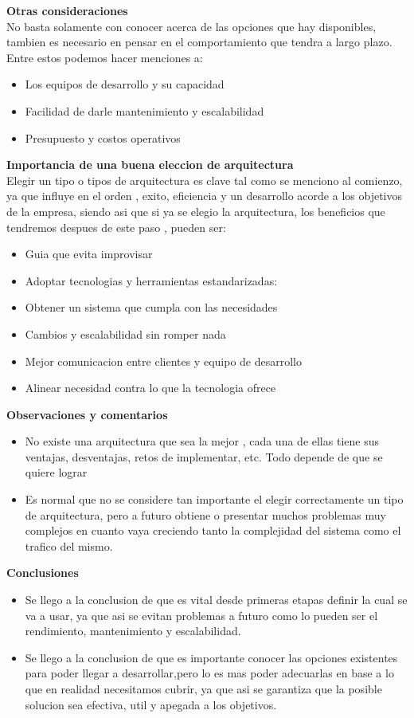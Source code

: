 \documentclass[12pt]{article}
\begin{document}
\textbf{Otras consideraciones}\\ 
No basta solamente con conocer acerca de las opciones que hay disponibles, tambien es necesario en pensar en el comportamiento que tendra a largo plazo. Entre estos podemos hacer menciones a:
\begin{itemize}
    \item{Los equipos de desarrollo y su capacidad}
    \item{Facilidad de darle mantenimiento y escalabilidad}
    \item{Presupuesto y costos operativos}
\end{itemize}

\textbf{Importancia de una buena eleccion de arquitectura} \\
Elegir un tipo o tipos de arquitectura es clave tal como se menciono al comienzo, ya que influye en el orden , exito, eficiencia y un desarrollo acorde a los objetivos de la empresa, siendo asi que si ya se elegio la arquitectura, los beneficios que tendremos despues de este paso , pueden ser:
\begin{itemize}
    \item{Guia que evita improvisar} 
    \item{Adoptar tecnologias y herramientas estandarizadas: }
     \item{Obtener un sistema que cumpla con las necesidades } 
     \item{Cambios y escalabilidad sin romper nada} 
     \item{Mejor comunicacion entre clientes y equipo de desarrollo } 
     \item{Alinear necesidad contra lo que la tecnologia ofrece}
\end{itemize}

\noindent\textbf{Observaciones y comentarios} 
\begin{itemize}
    \item{No existe una arquitectura que sea la mejor , cada una de ellas tiene sus ventajas, desventajas, retos de implementar, etc. Todo depende de que se quiere lograr}
    \item{Es normal que no se considere tan importante el elegir correctamente un tipo de arquitectura, pero a futuro obtiene o presentar muchos problemas muy complejos en cuanto vaya creciendo tanto la complejidad del sistema como el trafico del mismo.}
\end{itemize}

\noindent\textbf{Conclusiones} 
\begin{itemize}
    \item{Se llego a la conclusion de que es vital desde primeras etapas definir la cual se va a usar, ya que asi se evitan problemas a futuro como lo pueden ser el rendimiento, mantenimiento y escalabilidad.}
    \item {Se llego a la conclusion de que es importante conocer las opciones existentes para poder llegar a desarrollar,pero lo es mas poder adecuarlas en base a lo que en realidad necesitamos cubrir, ya que asi se garantiza que la posible solucion sea efectiva, util y apegada a los objetivos.}
\end{itemize}
\end{document}
